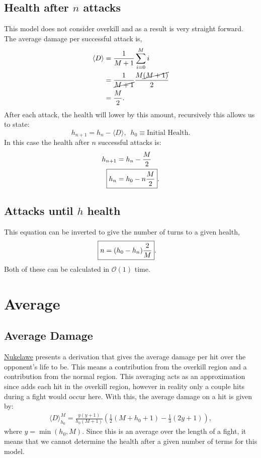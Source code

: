 			\subsection{Health after \texorpdfstring{$n$}{} attacks}
				This model does not consider overkill and as a result is very straight forward. The average damage per successful attack is,
				\begin{align}
					\langle D \rangle &= \frac{1}{M+1}\sum_{i=0}^M i\\
						&= \frac{1}{\cancel{M+1}} \frac{M\cancel{(M+1)}}{2}\\
						&= \frac{M}{2}.
				\end{align}
				After each attack, the health will lower by this amount, recursively this allows us to state:
				\begin{equation}
					h_{n+1} = h_{n} - \langle D \rangle,\,\,\,h_0\equiv\text{Initial Health}.
				\end{equation}
				In this case the health after $n$ successful attacks is:
				\begin{align}
					h_{n+1} &= h_{n} - \frac{M}{2}\\
					\Aboxed{h_{n} &= h_0 - n\frac{M}{2}}.
				\end{align}
			\subsection{Attacks until \texorpdfstring{$h$}{} health}
				This equation can be inverted to give the number of turns to a given health,
				\begin{align}
					\Aboxed{n &= (h_0 - h_{n}) \frac{2}{M}}.
				\end{align}
				Both of these can be calculated in $\mathcal{O}(1)$ time.
		\section{Average}
			\subsection{Average Damage}
				\href{https://imgur.com/aykEahg}{Nukelawe} presents a derivation that gives the average damage per hit over the opponent's life to be. This means a contribution from the overkill region and a contribution from the normal region. This averaging acts as an approximation since adds each hit in the overkill region, however in reality only a couple hits during a fight would occur here. With this, the average damage on a hit is given by:
				\begin{align}
					\langle D \rangle_{h_0}^M = \frac{y(y+1)}{h_0(M+1)}\left(\frac{1}{2}{(M+h_0+1)}-\frac{1}{3}(2y+1) \right),
				\end{align}
				where $y=\min(h_0, M)$. Since this is an average over the length of a fight, it means that we cannot determine the health after a given number of terms for this model.



